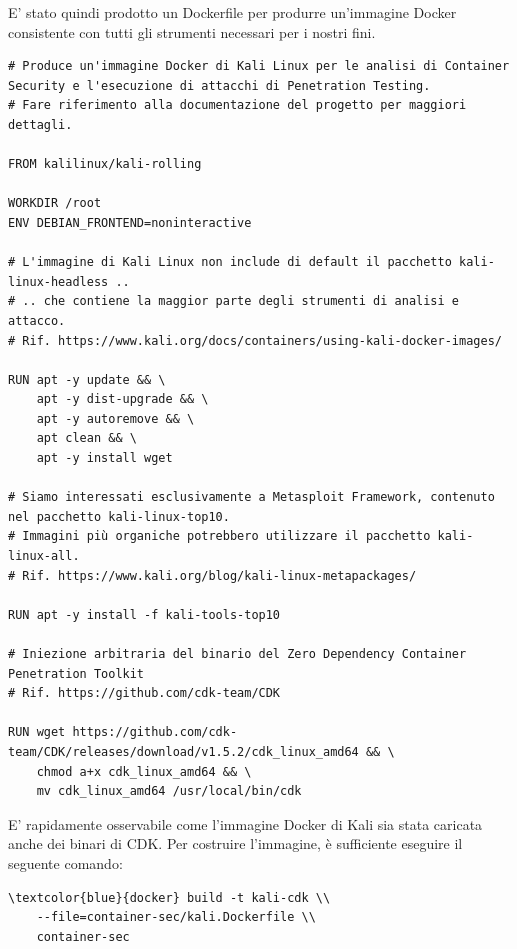E' stato quindi prodotto un Dockerfile per produrre un'immagine Docker consistente con tutti gli strumenti necessari per i nostri fini.

\begin{code}
\label{code:apx:a:dockerfile}
\begin{verbatim}
# Produce un'immagine Docker di Kali Linux per le analisi di Container Security e l'esecuzione di attacchi di Penetration Testing.
# Fare riferimento alla documentazione del progetto per maggiori dettagli.

FROM kalilinux/kali-rolling

WORKDIR /root
ENV DEBIAN_FRONTEND=noninteractive

# L'immagine di Kali Linux non include di default il pacchetto kali-linux-headless ..
# .. che contiene la maggior parte degli strumenti di analisi e attacco.
# Rif. https://www.kali.org/docs/containers/using-kali-docker-images/

RUN apt -y update && \
    apt -y dist-upgrade && \
    apt -y autoremove && \
    apt clean && \
    apt -y install wget

# Siamo interessati esclusivamente a Metasploit Framework, contenuto nel pacchetto kali-linux-top10.
# Immagini più organiche potrebbero utilizzare il pacchetto kali-linux-all.
# Rif. https://www.kali.org/blog/kali-linux-metapackages/

RUN apt -y install -f kali-tools-top10

# Iniezione arbitraria del binario del Zero Dependency Container Penetration Toolkit
# Rif. https://github.com/cdk-team/CDK

RUN wget https://github.com/cdk-team/CDK/releases/download/v1.5.2/cdk_linux_amd64 && \
    chmod a+x cdk_linux_amd64 && \
    mv cdk_linux_amd64 /usr/local/bin/cdk
\end{verbatim}
\end{code}

E' rapidamente osservabile come l'immagine Docker di Kali sia stata caricata anche dei binari di CDK. Per costruire l'immagine, è sufficiente eseguire il seguente comando:

\begin{small}
\begin{Verbatim}[commandchars=\\\{\}]
\textcolor{blue}{docker} build -t kali-cdk \\ 
    --file=container-sec/kali.Dockerfile \\ 
    container-sec
\end{Verbatim}
\end{small}

